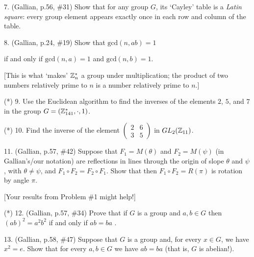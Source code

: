 \documentclass[12pt]{article}
\begin{document}
\begin{description}


\item{7.} (Gallian, p.56, \#31) Show that for any group $G$, its
`Cayley' table is a {\it Latin square}: every group element appears
exactly once in each row and column of the table.

\msk

\item{8.} (Gallian, p.24, \#19) Show that $\textrm{gcd}(n,ab)=1$ 

\item{\spc} \hskip2in if and only
if $\textrm{gcd}(n,a)=1$ and $\textrm{gcd}(n,b)=1$.

\ssk

\item{\spc} [This is what `makes' ${\mathbb Z}_n^*$ a group under multiplication;
the product of two numbers relatively prime to $n$ is a number relatively prime to $n$.]

\msk

\item{(*) 9.} Use the Euclidean algorithm to find the inverses of the 
elements $2$, $5$, and $7$ in the group $G=({\mathbb Z}_{141}^*,\cdot,1)$.

\msk

\item{(*) 10.} Find the inverse of the element
$\left( \begin{array}{cc} 2 & 6 \\ 3 & 5 \end{array} \right)$ in
$GL_2({\mathbb Z}_{11})$. 

\msk

\item{11.} (Gallian, p.57, \#42) Suppose that $F_1=M(\theta)$
and $F_2=M(\psi)$ (in Gallian's/our notation) are reflections 
in lines through the origin of slope $\theta$ and $\psi$, with $\theta\neq\psi$, and 
$F_1\circ F_2 = F_2\circ F_1$. Show that then 
$F_1\circ F_2 = R(\pi)$ is rotation by angle $\pi$.

\ssk

\item{\spc} [Your results from Problem \#1 might help!]

\msk

\item{(*) 12.} (Gallian, p.57, \#34) Prove that if $G$ is a group and
$a,b\in G$ then $(ab)^2=a^2b^2$ if and only if $ab=ba$ .

\msk

\item{13.} (Gallian, p.58, \#47) Suppose that $G$ is a group and, for every $x\in G$,
we have $x^2=e$. Show that for every $a,b\in G$ we have $ab=ba$ (that is, $G$ is abelian!).

\end{description}
\vfill
\end{document}
